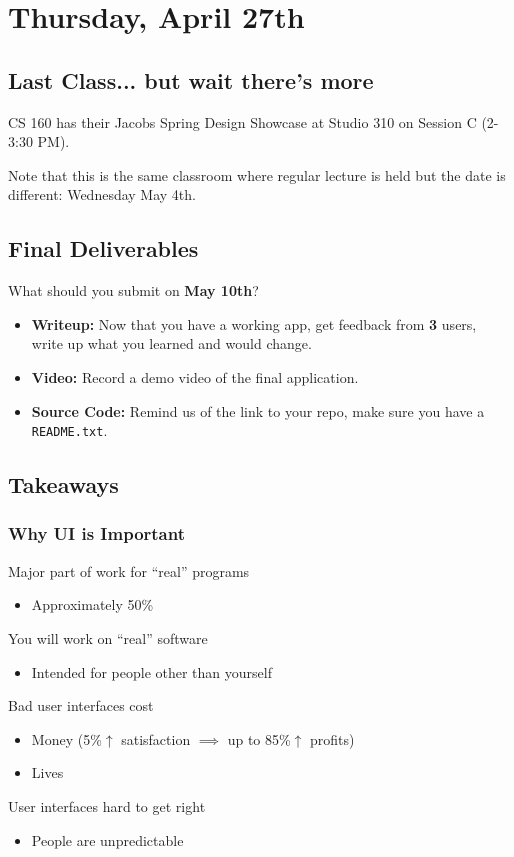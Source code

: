 \section{Thursday, April 27th}
\subsection{Last Class... but wait there's more}
CS 160 has their Jacobs Spring Design Showcase at Studio 310 on Session C (2-3:30 PM).

Note that this is the same classroom where regular lecture is held but the date is different: Wednesday May 4th.

\subsection{Final Deliverables}
What should you submit on \textbf{May 10th}?
\begin{itemize}
    \item \textbf{Writeup:} Now that you have a working app, get feedback from \textbf{3} users, write up what you learned and would change.
    \item \textbf{Video:} Record a demo video of the final application.
    \item \textbf{Source Code:} Remind us of the link to your repo, make sure you have a \texttt{README.txt}.
\end{itemize}

\subsection{Takeaways}
\subsubsection{Why UI is Important}
Major part of work for ``real'' programs
\begin{itemize}
    \item Approximately 50\%
\end{itemize}
You will work on “real” software
\begin{itemize}
    \item Intended for people other than yourself
\end{itemize}
Bad user interfaces cost
\begin{itemize}
    \item Money (5\%$\uparrow$ satisfaction $\implies$ up to 85\%$\uparrow$ profits)
    \item Lives
\end{itemize}
User interfaces hard to get right
\begin{itemize}
    \item People are unpredictable
\end{itemize}


